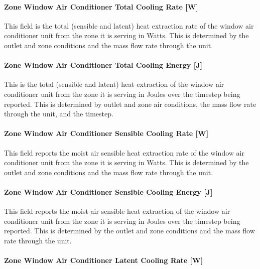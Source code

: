 \paragraph{Zone Window Air Conditioner Total Cooling Rate {[}W{]}}\label{zone-window-air-conditioner-total-cooling-rate-w}

This field is the total (sensible and latent) heat extraction rate of the window air conditioner unit from the zone it is serving in Watts. This is determined by the outlet and zone conditions and the mass flow rate through the unit.

\paragraph{Zone Window Air Conditioner Total Cooling Energy {[}J{]}}\label{zone-window-air-conditioner-total-cooling-energy-j}

This is the total (sensible and latent) heat extraction of the window air conditioner unit from the zone it is serving in Joules over the timestep being reported. This is determined by outlet and zone air conditions, the mass flow rate through the unit, and the timestep.

\paragraph{Zone Window Air Conditioner Sensible Cooling Rate {[}W{]}}\label{zone-window-air-conditioner-sensible-cooling-rate-w}

This field reports the moist air sensible heat extraction rate of the window air conditioner unit from the zone it is serving in Watts. This is determined by the outlet and zone conditions and the mass flow rate through the unit.

\paragraph{Zone Window Air Conditioner Sensible Cooling Energy {[}J{]}}\label{zone-window-air-conditioner-sensible-cooling-energy-j}

This field reports the moist air sensible heat extraction of the window air conditioner unit from the zone it is serving in Joules over the timestep being reported. This is determined by the outlet and zone conditions and the mass flow rate through the unit.

\paragraph{Zone Window Air Conditioner Latent Cooling Rate {[}W{]}}\label{zone-window-air-conditioner-latent-cooling-rate-w}

